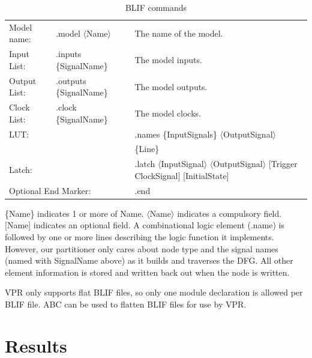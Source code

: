 \documentclass[12pt,final,oneside]{dwThesis} %
\begin{document}
\begin{table}
   \begin{tabular}
      {lll} Model name: & .model $\langle$Name$\rangle$ & The name
      of the model.\\
      Input List: & .inputs \{SignalName\} & The model inputs.\\

      Output List:& .outputs \{SignalName\} & The model outputs.\\
      Clock List: &
      .clock \{SignalName\} & The model clocks.\\

      \multicolumn{2}{l}{\gls{LUT}:} & .names \{InputSignals\}
      $\langle$OutputSignal$\rangle$\\
      &&\{Line\}\\
      \multicolumn{2}{l}{Latch:}
      & .latch $\langle$InputSignal$\rangle$ $\langle$OutputSignal$\rangle$
      [Trigger ClockSignal] [InitialState]\\
      \multicolumn{2}{l}{Optional End Marker:} &
      .end 
   \end{tabular}
   \caption{\gls{BLIF} commands}\label{BLIFCommands}
\end{table}


   \{Name\} indicates 1 or more of Name. $\langle$Name$\rangle$ indicates a
   compulsory field. [Name] indicates an optional field.  A combinational logic
   element (.name) is followed by one or more lines describing the logic
   function it implements. However, our partitioner only cares about node type
   and the signal names (named with SignalName above) as it builds and traverses the
   \gls{DFG}. All other element information is stored and written back out when
   the node is written.

   \gls{VPR} only supports flat \gls{BLIF} files, so only one module
   declaration is allowed per \gls{BLIF} file. \gls{ABC} can be used to flatten
   \gls{BLIF} files for use by \gls{VPR}.




   \chapter{Results}\label{results}
\end{document}
